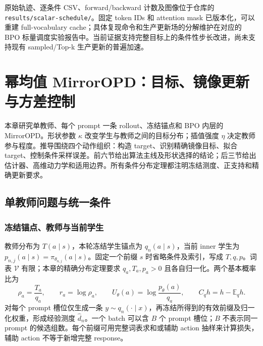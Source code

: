 \documentclass[lang=cn,scheme=chinese,openany]{../book/elegantbook}
\newcommand{\E}{\mathbb E}
\begin{document}
原始轨迹、逐条件 CSV、forward/backward 计数及图像位于仓库的 \texttt{results/scalar-schedule/}。固定 token IDs 和 attention mask 已版本化，可以重建 full-vocabulary cache；具体复现命令和生产更新场的分解维护在对应的 BPO 标量调度实验报告中。当前证据支持完整目标上的条件性步长改进，尚未支持现有 sampled/Top-k 生产更新的普遍加速。





\chapter{幂均值 MirrorOPD：目标、镜像更新与方差控制}
\label{ch:proximal-families}

本章研究单教师、每个 prompt 一条 rollout、冻结锚点和 BPO 内层的 MirrorOPD。形状参数 $\kappa$ 改变学生与教师之间的目标分布；插值强度 $\eta$ 决定教师参与程度。推导围绕四个动作组织：构造 target、识别精确镜像目标、拟合 target、控制条件采样误差。前六节给出算法主线及形状选择的结论；后三节给出估计器、高维动力学和适用边界。所有条件分布定理都注明冻结测度、正支持和精确更新要求。

\section{单教师问题与统一条件}
\label{sec:power-setup}

\subsection{冻结锚点、教师与当前学生}

教师分布为 $T(a\mid s)$，本轮冻结学生锚点为 $q_n(a\mid s)$，当前 inner 学生为 $p_{n,j}(a\mid s)=\pi_{\theta_{n,j}}(a\mid s)$。固定一个前缀 $s$ 时省略条件及索引，写成 $T,q,p$。词表 $\mathcal V$ 有限；本章的精确分布定理要求 $q_a,T_a,p_a>0$ 且各自归一化。两个基本概率比为
\begin{equation}
 \rho_a=\frac{T_a}{q_a},\qquad r_a=\log\rho_a,\qquad
 U_\theta(a)=\log\frac{p_\theta(a)}{q_a},\qquad
 C_qh=h-\E_qh.
 \label{eq:power-chapter-ratios}
\end{equation}
对每个 prompt 槽位仅生成一条 $y\sim q_n(\cdot\mid x)$，再冻结所得到的有效前缀及归一化权重，形成经验测度 $\widehat d_n$。一个 batch 可以含 $B$ 个 prompt 槽位；$B$ 不表示同一 prompt 的候选组数。每个前缀可用完整词表求和或辅助 action 抽样来计算损失，辅助 action 不等于新增完整 response。
\end{document}
